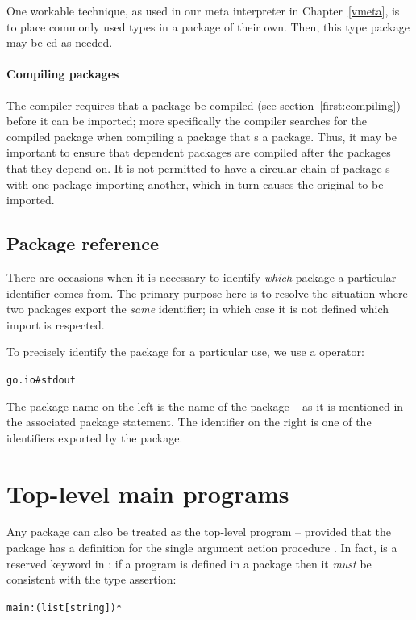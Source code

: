 \begin{aside}
One workable technique, as used in our meta interpreter in Chapter~\ref{vmeta}, is to place commonly used types in a package of their own. Then, this type package may be ed as needed.
\end{aside}

\paragraph{Compiling packages}
The \go compiler requires that a package be compiled (see section~\vref{first:compiling}) before it can be imported; more specifically the compiler searches for the compiled package when compiling a package that s a package. Thus, it may be important to ensure that dependent packages are compiled after the packages that they depend on. It is not permitted to have a circular chain of package s -- with one package importing another, which in turn causes the original to be imported.

\subsection{Package reference}
\label{package:reference}
There are occasions when it is necessary to identify \emph{which} package a particular identifier comes from. The primary purpose here is to resolve the situation where two packages export the \emph{same} identifier; in which case it is not defined which import is respected.

To precisely identify the package for a particular use, we use a \q{\hash} operator:
\begin{alltt}
go.io#stdout
\end{alltt}
The package name on the left is the name of the package -- as it is mentioned in the associated package  statement. The identifier on the right is one of the identifiers exported by the package.

\section{Top-level main programs}
\label{program:top-level}
Any package can also be treated as the top-level program -- provided that the package has a definition for the single argument action procedure . In fact,  is a reserved keyword in \go: if a  program is defined in a package then it \emph{must} be consistent with the type assertion:
\begin{alltt}
main:(list[string])*
\end{alltt}

